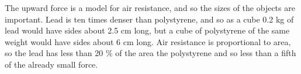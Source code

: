 \begin{problem}[O1978PIIQ1a]
{\begin{enumerate}
The upward force is a model for air resistance, and so the sizes of the objects are important. Lead is ten times denser than polystyrene, and so as a cube 0.2 kg of lead would have sides about 2.5 cm long, but a cube of polystyrene of the same weight would have sides about 6 cm long. Air resistance is proportional to area, so the lead has less than 20 \% of the area the polystyrene and so less than a fifth of the already small force.
\end{enumerate}
}
\end{problem}